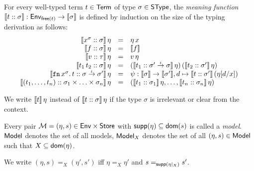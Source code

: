 \documentclass[12pt,a4paper]{report}
\begin{document}
\begin{definition}
  For every well-typed term $t \in \mathsf{Term}$ of type $\sigma \in \mathsf{SType}$, the {\em meaning function}
  $\llbracket{t}\mathrel{::}{\sigma}\rrbracket: \mathsf{Env}_{\mathsf{free}(t)} \to \llbracket\sigma\rrbracket$ is defined by induction on the size
  of the typing derivation as follows:
  \[\begin{array}{rcl}
    \llbracket{x^\sigma}\mathrel{::}{\sigma}\rrbracket\,\eta
      &=& \eta\,x \\
    \llbracket{f}\mathrel{::}{\sigma}\rrbracket\,\eta 
      &=& \llbracket f\rrbracket \\
    \llbracket{v}\mathrel{::}{\tau}\rrbracket\,\eta
      &=& v\,\eta \\
    \llbracket{t_1\,t_2}\mathrel{::}{\sigma}\rrbracket\,\eta
      &=& (\llbracket{t_1}\mathrel{::}{\sigma'\stackrel{_t}{\to}\sigma}\rrbracket\,\eta)\,
          (\llbracket{t_2}\mathrel{::}{\sigma'}\rrbracket\,\eta) \\
    \llbracket{\ensuremath{\mathtt{fn}}\,x^\sigma.\,t}\mathrel{::}{\sigma\stackrel{_t}{\to}\sigma'}\rrbracket\,\eta
      &=& \psi: \llbracket\sigma\rrbracket \to \llbracket\sigma'\rrbracket, d \mapsto \llbracket{t}\mathrel{::}{\sigma'}\rrbracket\,(\eta[d/x]) \\
    \llbracket{(t_1,\ldots,t_n)}\mathrel{::}{\sigma_1\times\ldots\times\sigma_n}\rrbracket\,\eta
      &=& (\llbracket{t_1}\mathrel{::}{\sigma_1}\rrbracket\,\eta,\ldots,\llbracket{t_n}\mathrel{::}{\sigma_n}\rrbracket\,\eta)
  \end{array}\]
\end{definition}

We write $\llbracket t\rrbracket\,\eta$ instead of $\llbracket{t}\mathrel{::}{\sigma}\rrbracket\,\eta$ if the type $\sigma$ is irrelevant or
clear from the context.

\begin{definition}[Model]
  Every pair $\mathcal{M} = (\eta,s) \in \mathsf{Env} \times \mathsf{Store}$ with $\mathsf{supp}(\eta) \subseteq \mathsf{dom}(s)$
  is called a {\em model}. $\mathsf{Model}$ denotes the set of all models, $\mathsf{Model}_X$ denotes the set of all
  $(\eta,s) \in \mathsf{Model}$ such that $X \subseteq \mathsf{dom}(\eta)$.
\end{definition}

We write $(\eta,s) =_X (\eta',s')$ iff $\eta =_X \eta'$ and $s =_{\mathsf{supp}(\eta|_X)} s'$.
\end{document}
